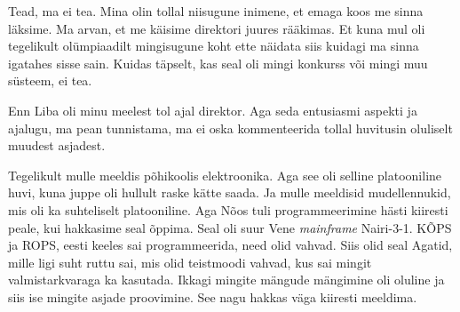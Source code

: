 
Tead, ma ei tea. Mina olin tollal niisugune inimene, et emaga koos me sinna 
läksime. Ma arvan, et me käisime direktori juures rääkimas. Et kuna mul oli 
tegelikult olümpiaadilt mingisugune koht ette näidata siis kuidagi ma sinna 
igatahes sisse sain. Kuidas täpselt, kas seal oli mingi konkurss või mingi muu 
süsteem, ei tea. 


Enn Liba oli minu meelest tol ajal direktor. Aga 
seda entusiasmi aspekti ja ajalugu, ma pean tunnistama,  ma ei oska 
kommenteerida tollal huvitusin  oluliselt muudest asjadest.


Tegelikult mulle meeldis põhikoolis elektroonika. Aga see oli selline 
platooniline huvi, kuna juppe oli hullult raske kätte saada. Ja mulle meeldisid 
mudellennukid, mis oli ka suhteliselt platooniline. Aga Nõos tuli 
programmeerimine hästi kiiresti peale, kui hakkasime seal õppima. Seal oli suur 
Vene \emph{mainframe} Nairi-3-1. 
KÕPS ja ROPS, eesti keeles sai 
programmeerida, need olid  vahvad. Siis olid seal Agatid, 
mille ligi suht ruttu sai, mis olid teistmoodi vahvad, kus sai mingit 
valmistarkvaraga ka kasutada. Ikkagi mingite mängude mängimine oli oluline ja  
siis ise mingite asjade proovimine. See nagu hakkas väga kiiresti meeldima.

